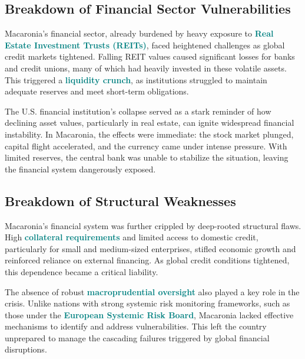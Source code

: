 \subsection*{Breakdown of Financial Sector Vulnerabilities}  
Macaronia’s financial sector, already burdened by heavy exposure to \textbf{\textcolor{teal}{Real Estate Investment Trusts (REITs)}}, faced heightened challenges as global credit markets tightened. Falling REIT values caused significant losses for banks and credit unions, many of which had heavily invested in these volatile assets. This triggered a \textbf{\textcolor{teal}{liquidity crunch}}, as institutions struggled to maintain adequate reserves and meet short-term obligations.  

The U.S. financial institution’s collapse served as a stark reminder of how declining asset values, particularly in real estate, can ignite widespread financial instability. In Macaronia, the effects were immediate: the stock market plunged, capital flight accelerated, and the currency came under intense pressure. With limited reserves, the central bank was unable to stabilize the situation, leaving the financial system dangerously exposed.  



\subsection*{Breakdown of Structural Weaknesses}  
Macaronia’s financial system was further crippled by deep-rooted structural flaws. High \textbf{\textcolor{teal}{collateral requirements}} and limited access to domestic credit, particularly for small and medium-sized enterprises, stifled economic growth and reinforced reliance on external financing. As global credit conditions tightened, this dependence became a critical liability.  

The absence of robust \textbf{\textcolor{teal}{macroprudential oversight}} also played a key role in the crisis. Unlike nations with strong systemic risk monitoring frameworks, such as those 
under the \textbf{\textcolor{teal}{European Systemic Risk Board}}, Macaronia lacked effective mechanisms to identify and address vulnerabilities. This left the country unprepared to manage the cascading failures 
triggered by global financial disruptions.  \textcolor{orange}{\cite{ECB2023ESRB}}


